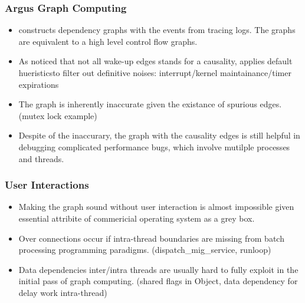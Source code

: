\subsubsection{Argus Graph Computing}
\begin{itemize}
\item \xxx constructs dependency graphs with the events from tracing logs. The graphs are equivalent to a high level control flow graphs.
\item As noticed that not all wake-up edges stands for a causality, \xxx applies default hueristicsto filter out definitive noises: interrupt/kernel maintainance/timer expirations
\item The graph is inherently inaccurate given the existance of spurious edges. (mutex lock example)
\item Despite of the inaccurary, the graph with the causality edges is still helpful in debugging complicated performance bugs, which involve mutilple processes and threads.
\end{itemize}

\subsubsection{User Interactions}
\begin{itemize}
\item Making the graph sound without user interaction is almost impossible given essential attribite of commericial operating system as a grey box.
\item Over connections occur if intra-thread boundaries are missing from batch processing programming paradigms. (dispatch\_mig\_service, runloop)
\item Data dependencies inter/intra threads are usually hard to fully exploit in the initial pass of graph computing. (shared flags in Object, data dependency for delay work intra-thread)
\end{itemize}
